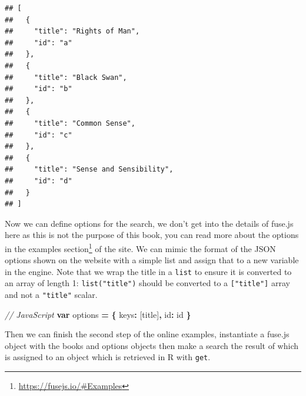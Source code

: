\documentclass[
]{krantz}
\makeatletter
\newenvironment{Shaded}{\begin{snugshade}}{\end{snugshade}}
\newcommand{\CommentTok}[1]{\textcolor[rgb]{0.37,0.37,0.37}{\textit{#1}}}
\newcommand{\DataTypeTok}[1]{\textcolor[rgb]{0.27,0.27,0.27}{#1}}
\newcommand{\KeywordTok}[1]{\textcolor[rgb]{0.27,0.27,0.27}{\textbf{#1}}}
\newcommand{\NormalTok}[1]{#1}
\newcommand{\OperatorTok}[1]{\textcolor[rgb]{0.43,0.43,0.43}{\textbf{#1}}}
\newcommand{\StringTok}[1]{\textcolor[rgb]{0.5,0.5,0.5}{#1}}
\renewcommand{\href}[2]{#2\footnote{\url{#1}}}
\newenvironment{kframe}{%
\medskip{}
\setlength{\fboxsep}{.8em}
 \def\at@end@of@kframe{}%
 \ifinner\ifhmode%
  \def\at@end@of@kframe{\end{minipage}}%
  \begin{minipage}{\columnwidth}%
 \fi\fi%
 \def\FrameCommand##1{\hskip\@totalleftmargin \hskip-\fboxsep
 \colorbox{shadecolor}{##1}\hskip-\fboxsep
     \hskip-\linewidth \hskip-\@totalleftmargin \hskip\columnwidth}%
 \MakeFramed {\advance\hsize-\width
   \@totalleftmargin\z@ \linewidth\hsize
   \@setminipage}}%
 {\par\unskip\endMakeFramed%
 \at@end@of@kframe}
\renewenvironment{Shaded}{\begin{kframe}}{\end{kframe}}
\makeatother
\begin{document}
\begin{verbatim}
## [
##   {
##     "title": "Rights of Man",
##     "id": "a"
##   },
##   {
##     "title": "Black Swan",
##     "id": "b"
##   },
##   {
##     "title": "Common Sense",
##     "id": "c"
##   },
##   {
##     "title": "Sense and Sensibility",
##     "id": "d"
##   }
## ]
\end{verbatim}

Now we can define options for the search, we don't get into the details of fuse.js here as this is not the purpose of this book, you can read more about the options in the \href{https://fusejs.io/\#Examples}{examples section} of the site. We can mimic the format of the JSON options shown on the website with a simple list and assign that to a new variable in the engine. Note that we wrap the title in a \texttt{list} to ensure it is converted to an array of length 1: \texttt{list("title")} should be converted to a \texttt{{[}"title"{]}} array and not a \texttt{"title"} scalar.

\begin{Shaded}
\begin{Highlighting}[]
\CommentTok{// JavaScript}
\KeywordTok{var}\NormalTok{ options }\OperatorTok{=} \OperatorTok{\{}
  \DataTypeTok{keys}\OperatorTok{:}\NormalTok{ [}\StringTok{\textquotesingle{}title\textquotesingle{}}\NormalTok{]}\OperatorTok{,}
  \DataTypeTok{id}\OperatorTok{:} \StringTok{\textquotesingle{}id\textquotesingle{}}
\OperatorTok{\}}
\end{Highlighting}
\end{Shaded}

\begin{Shaded}
\end{Shaded}

Then we can finish the second step of the online examples, instantiate a fuse.js object with the books and options objects then make a search the result of which is assigned to an object which is retrieved in R with \texttt{get}.

\begin{Shaded}
\end{Shaded}
\end{document}
